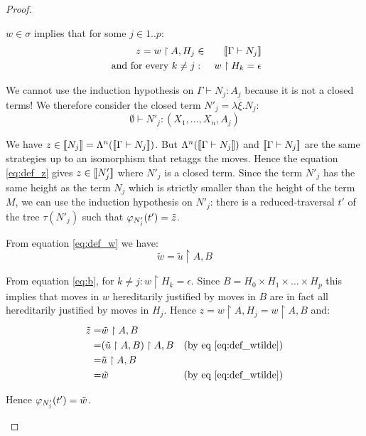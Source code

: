 \begin{proof}
\begin{itemize}
\begin{itemize}
    $w \in \sigma$ implies that for some $j \in 1..p$:
    \begin{eqnarray}
        z = w \upharpoonright A, H_j &\in& {[\![ \Gamma \vdash N_j ]\!]}  \label{eq:def_z} \\
        \mbox{ and for every } k\neq j &:& w \upharpoonright H_k = \epsilon \label{eq:b}
    \end{eqnarray}

    We cannot use the induction hypothesis on $\Gamma \vdash N_j : A_j$ because it is not a closed terms!
    We therefore consider the closed term $N'_j = \lambda \overline{\xi} . N_j$:
        $$\emptyset \vdash N'_j : (X_1, \ldots, X_n,A_j)$$

    We have $z \in {[\![N_j ]\!]} = \Lambda^n({[\![ \Gamma \vdash N_j ]\!]})$. But $\Lambda^n({[\![ \Gamma \vdash N_j ]\!]})$
    and ${[\![ \Gamma \vdash N_j ]\!]}$ are the same strategies up to an isomorphism that
    retaggs the moves. Hence the equation \ref{eq:def_z} gives $z \in {[\![N'_j ]\!]}$ where $N'_j$ is a closed term. Since
    the term $N'_j$ has the same height as the term $N_j$ which is strictly smaller than the height
    of the term $M$, we can use the induction hypothesis on $N'_j$:
    there is a reduced-traversal $t'$ of the tree $\tau(N'_j)$
    such that $\varphi_{N'_j}(t') = \tilde{z}$.




    From equation \ref{eq:def_w} we have:
    \begin{equation}
        \tilde{w} = \tilde{u} \upharpoonright A,B
        \label{eq:def_wtilde}
    \end{equation}

    From equation \ref{eq:b}, for $k\neq j : w \upharpoonright H_k = \epsilon$. Since $B =
    H_0 \times H_1 \times \ldots \times H_p$ this implies that moves in $w$ hereditarily justified by moves in $B$ are in fact all
    hereditarily justified by moves in $H_j$.  Hence $z = w \upharpoonright A, H_j = w \upharpoonright A, B$ and:
    \begin{eqnarray*}
            \tilde{z} =& \tilde{w} \upharpoonright A,B \\
            =& (\tilde{u} \upharpoonright A,B) \upharpoonright A,B &\mbox{(by eq \ref{eq:def_wtilde})} \\
            =& \tilde{u} \upharpoonright A,B \\
            =& \tilde{w}  & \mbox{(by eq \ref{eq:def_wtilde})}
    \end{eqnarray*}


    Hence $\varphi_{N'_j}(t') = \tilde{w}$.



\end{itemize}
\end{itemize}
\end{proof}
